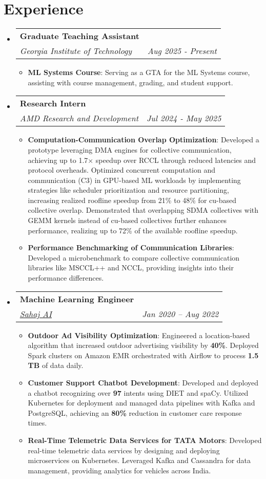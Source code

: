 \documentclass[a4paper,20pt]{article}
\makeatletter
\newcommand{\resumeItem}[2]{
  \item\small{
    \textbf{#1}{: #2 \vspace{-2pt}}
  }
}
\newcommand{\resumeSubheading}[4]{
  \vspace{-1pt}\item
    \begin{tabular*}{0.97\textwidth}{l@{\extracolsep{\fill}}r}
      \textbf{#1} & #2 \\
      \textit{#3} & \textit{#4} \\
    \end{tabular*}\vspace{-5pt}
}
\newcommand{\resumeSubHeadingListStart}{\begin{itemize}[leftmargin=*]}
\newcommand{\resumeSubHeadingListEnd}{\end{itemize}}
\newcommand{\resumeItemListStart}{\begin{itemize}}
\newcommand{\resumeItemListEnd}{\end{itemize}\vspace{-5pt}}
\makeatother
\begin{document}
\vspace{-5pt}


\section{Experience}
  \resumeSubHeadingListStart
    \resumeSubheading{Graduate Teaching Assistant}{}
      {Georgia Institute of Technology}{Aug 2025 - Present}
      \resumeItemListStart
        \resumeItem{\textbf{ML Systems Course}}{Serving as a GTA for the ML Systems course, assisting with course management, grading, and student support.}
      \resumeItemListEnd

    \resumeSubheading{Research Intern}{}
      {AMD Research and Development}{Jul 2024 - May 2025}
      \resumeItemListStart
              \resumeItem{\textbf{Computation-Communication Overlap Optimization}}{Developed a prototype leveraging DMA engines for collective communication, achieving up to 1.7× speedup over RCCL through reduced latencies and protocol overheads. Optimized concurrent computation and communication (C3) in GPU-based ML workloads by implementing strategies like scheduler prioritization and resource partitioning, increasing realized roofline speedup from 21\% to 48\% for cu-based collective overlap. Demonstrated that overlapping SDMA collectives with GEMM kernels instead of cu-based collectives further enhances performance, realizing up to 72\% of the available roofline speedup.}
        \resumeItem{\textbf{Performance Benchmarking of Communication Libraries}}{Developed a microbenchmark to compare collective communication libraries like MSCCL++ and NCCL, providing insights into their performance differences.}

      \resumeItemListEnd


    \resumeSubheading{Machine Learning Engineer}{}
      {\href{https://sahaj.ai}{Sahaj AI}}{Jan 2020 -- Aug 2022}
      \resumeItemListStart
        \resumeItem{\textbf{Outdoor Ad Visibility Optimization}}{Engineered a location-based algorithm that increased outdoor advertising visibility by \textbf{40\%}. Deployed Spark clusters on Amazon EMR orchestrated with Airflow to process \textbf{1.5 TB} of data daily.}
        \resumeItem{\textbf{Customer Support Chatbot Development}}{Developed and deployed a chatbot recognizing over \textbf{97} intents using DIET and spaCy. Utilized Kubernetes for deployment and managed data pipelines with Kafka and PostgreSQL, achieving an \textbf{80\%} reduction in customer care response times.}
        \resumeItem{\textbf{Real-Time Telemetric Data Services for TATA Motors}}{Developed real-time telemetric data services by designing and deploying microservices on Kubernetes. Leveraged Kafka and Cassandra for data management, providing analytics for vehicles across India.}
      \resumeItemListEnd
  \resumeSubHeadingListEnd
\end{document}

